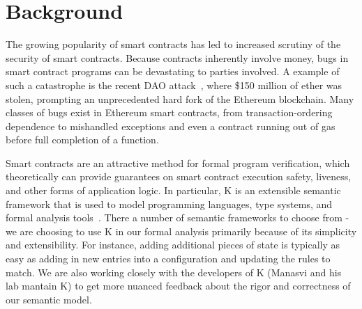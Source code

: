 \section{Background} The growing popularity of smart contracts has led to
increased scrutiny of the security of smart contracts. Because contracts
inherently involve money, bugs in smart contract programs can be devastating to
parties involved. A example of such a catastrophe is the recent DAO
attack~\cite{dao-attack}, where \$150 million of ether was stolen, prompting an
unprecedented hard fork of the Ethereum blockchain. Many classes of bugs exist
in Ethereum smart contracts, from transaction-ordering dependence to mishandled
exceptions and even a contract running out of gas before full completion of a
function. 

Smart contracts are an attractive method for formal program verification, which
theoretically can provide guarantees on smart contract execution safety,
liveness, and other forms of application logic. In particular, K is an
extensible semantic framework that is used to model programming languages, type
systems, and formal analysis tools~\cite{rosu-serbanuta-2010-jlap}. There a
number of semantic frameworks to choose from - we are choosing to use K in our
formal analysis primarily because of its simplicity and extensibility. For
instance, adding additional pieces of state is typically as easy as adding in
new entries into a configuration and updating the rules to match. We are also
working closely with the developers of K (Manasvi and his lab mantain K) to get
more nuanced feedback about the rigor and correctness of our semantic model. 

